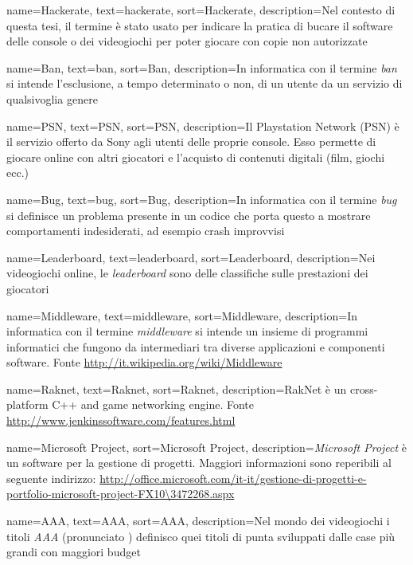 {
	name=Hackerate,
	text=hackerate,
	sort=Hackerate,
	description={Nel contesto di questa tesi, il termine è stato usato per indicare la pratica di bucare il software delle console o dei videogiochi per poter giocare con copie non autorizzate}
}

{
	name=Ban,
	text=ban,
	sort=Ban,
	description={In informatica con il termine \emph{ban} si intende l'esclusione, a tempo determinato o non, di un utente da un servizio di qualsivoglia genere}
}

{
	name=PSN\textsuperscript{\textregistered},
	text=PSN\textsuperscript{\textregistered},
	sort=PSN,
	description={Il Playstation Network\textsuperscript{\textregistered} (PSN\textsuperscript{\textregistered}) è il servizio offerto da Sony agli utenti delle proprie console. Esso permette di giocare online con altri giocatori e l'acquisto di contenuti digitali (film, giochi ecc.)}
}

{
	name=Bug,
	text=bug,
	sort=Bug,
	description={In informatica con il termine \emph{bug} si definisce un problema presente in un codice che porta questo a mostrare comportamenti indesiderati, ad esempio crash improvvisi}
}

{
	name=Leaderboard,
	text=leaderboard,
	sort=Leaderboard,
	description={Nei videogiochi online, le \emph{leaderboard} sono delle classifiche sulle prestazioni dei giocatori}
}

{
	name=Middleware,
	text=middleware,
	sort=Middleware,
	description={In informatica con il termine \emph{middleware} si intende un insieme di programmi informatici che fungono da intermediari tra diverse applicazioni e componenti software. Fonte \url{http://it.wikipedia.org/wiki/Middleware}}
}

{
	name=Raknet,
	text=Raknet,
	sort=Raknet,
	description={RakNet è un cross-platform C++ and \Csharp\space game networking engine. Fonte \url{http://www.jenkinssoftware.com/features.html}}
}

{
	name=Microsoft Project,
	sort=Microsoft Project,
	description={\emph{Microsoft Project} è un software per la gestione di progetti. Maggiori informazioni sono reperibili al seguente indirizzo: \url{http://office.microsoft.com/it-it/gestione-di-progetti-e-portfolio-microsoft-project-FX10\3472268.aspx}}
}

{
	name=AAA,
	text=AAA,
	sort=AAA,
	description={Nel mondo dei videogiochi i titoli \emph{AAA} (pronunciato ) definisco quei titoli di punta sviluppati dalle case più grandi con maggiori budget}
}


